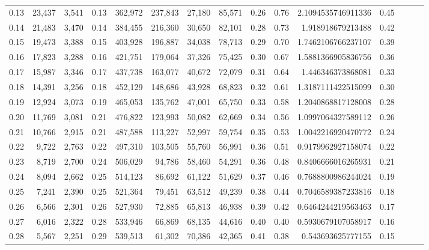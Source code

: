 \begin{tabular}{rrrrrrrrrrrrrrr}
0.13 &  23,437 &  3,541 &  0.13 &  362,972 &  237,843 &   27,180 &   85,571 &  0.26 &  0.76 &      2.1094535746911336 &      0.45 \\
0.14 &  21,483 &  3,470 &  0.14 &  384,455 &  216,360 &   30,650 &   82,101 &  0.28 &  0.73 &       1.918918679213488 &      0.42 \\
0.15 &  19,473 &  3,388 &  0.15 &  403,928 &  196,887 &   34,038 &   78,713 &  0.29 &  0.70 &      1.7462106766237107 &      0.39 \\
0.16 &  17,823 &  3,288 &  0.16 &  421,751 &  179,064 &   37,326 &   75,425 &  0.30 &  0.67 &      1.5881366905836756 &      0.36 \\
0.17 &  15,987 &  3,346 &  0.17 &  437,738 &  163,077 &   40,672 &   72,079 &  0.31 &  0.64 &       1.446346373868081 &      0.33 \\
0.18 &  14,391 &  3,256 &  0.18 &  452,129 &  148,686 &   43,928 &   68,823 &  0.32 &  0.61 &      1.3187111422515099 &      0.30 \\
0.19 &  12,924 &  3,073 &  0.19 &  465,053 &  135,762 &   47,001 &   65,750 &  0.33 &  0.58 &      1.2040868817128008 &      0.28 \\
0.20 &  11,769 &  3,081 &  0.21 &  476,822 &  123,993 &   50,082 &   62,669 &  0.34 &  0.56 &      1.0997064327589112 &      0.26 \\
0.21 &  10,766 &  2,915 &  0.21 &  487,588 &  113,227 &   52,997 &   59,754 &  0.35 &  0.53 &      1.0042216920470772 &      0.24 \\
0.22 &   9,722 &  2,763 &  0.22 &  497,310 &  103,505 &   55,760 &   56,991 &  0.36 &  0.51 &      0.9179962927158074 &      0.22 \\
0.23 &   8,719 &  2,700 &  0.24 &  506,029 &   94,786 &   58,460 &   54,291 &  0.36 &  0.48 &      0.8406666016265931 &      0.21 \\
0.24 &   8,094 &  2,662 &  0.25 &  514,123 &   86,692 &   61,122 &   51,629 &  0.37 &  0.46 &      0.7688800986244024 &      0.19 \\
0.25 &   7,241 &  2,390 &  0.25 &  521,364 &   79,451 &   63,512 &   49,239 &  0.38 &  0.44 &      0.7046589387233816 &      0.18 \\
0.26 &   6,566 &  2,301 &  0.26 &  527,930 &   72,885 &   65,813 &   46,938 &  0.39 &  0.42 &      0.6464244219563463 &      0.17 \\
0.27 &   6,016 &  2,322 &  0.28 &  533,946 &   66,869 &   68,135 &   44,616 &  0.40 &  0.40 &      0.5930679107058917 &      0.16 \\
0.28 &   5,567 &  2,251 &  0.29 &  539,513 &   61,302 &   70,386 &   42,365 &  0.41 &  0.38 &       0.543693625777155 &      0.15 \\

\end{tabular}
